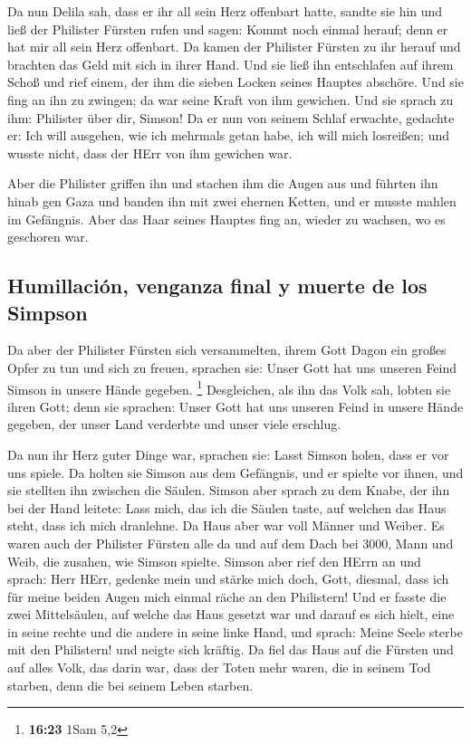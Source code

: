  Da nun Delila sah, dass er ihr all sein Herz offenbart
hatte, sandte sie hin und ließ der Philister Fürsten rufen und sagen:
Kommt noch einmal herauf; denn er hat mir all sein Herz offenbart. Da
kamen der Philister Fürsten zu ihr herauf und brachten das Geld mit sich
in ihrer Hand.  Und sie ließ ihn entschlafen auf ihrem
Schoß und rief einem, der ihm die sieben Locken seines Hauptes abschöre.
Und sie fing an ihn zu zwingen; da war seine Kraft von ihm gewichen.
 Und sie sprach zu ihm: Philister über dir, Simson! Da er
nun von seinem Schlaf erwachte, gedachte er: Ich will ausgehen, wie ich
mehrmals getan habe, ich will mich losreißen; und wusste nicht, dass der
HErr von ihm gewichen war.

 Aber die Philister griffen ihn und stachen ihm die Augen
aus und führten ihn hinab gen Gaza und banden ihn mit zwei ehernen
Ketten, und er musste mahlen im Gefängnis.  Aber das Haar
seines Hauptes fing an, wieder zu wachsen, wo es geschoren war.

\hypertarget{humillaciuxf3n-venganza-final-y-muerte-de-los-simpson}{%
\subsection{Humillación, venganza final y muerte de los
Simpson}\label{humillaciuxf3n-venganza-final-y-muerte-de-los-simpson}}

 Da aber der Philister Fürsten sich versammelten, ihrem
Gott Dagon ein großes Opfer zu tun und sich zu freuen, sprachen sie:
Unser Gott hat uns unseren Feind Simson in unsere Hände gegeben.
\footnote{\textbf{16:23} 1Sam 5,2}  Desgleichen, als ihn
das Volk sah, lobten sie ihren Gott; denn sie sprachen: Unser Gott hat
uns unseren Feind in unsere Hände gegeben, der unser Land verderbte und
unser viele erschlug.

 Da nun ihr Herz guter Dinge war, sprachen sie: Lasst
Simson holen, dass er vor uns spiele. Da holten sie Simson aus dem
Gefängnis, und er spielte vor ihnen, und sie stellten ihn zwischen die
Säulen.  Simson aber sprach zu dem Knabe, der ihn bei der
Hand leitete: Lass mich, das ich die Säulen taste, auf welchen das Haus
steht, dass ich mich dranlehne.  Da Haus aber war voll
Männer und Weiber. Es waren auch der Philister Fürsten alle da und auf
dem Dach bei 3000, Mann und Weib, die zusahen, wie Simson spielte.
 Simson aber rief den HErrn an und sprach: Herr HErr,
gedenke mein und stärke mich doch, Gott, diesmal, dass ich für meine
beiden Augen mich einmal räche an den Philistern!  Und er
fasste die zwei Mittelsäulen, auf welche das Haus gesetzt war und darauf
es sich hielt, eine in seine rechte und die andere in seine linke Hand,
 und sprach: Meine Seele sterbe mit den Philistern! und
neigte sich kräftig. Da fiel das Haus auf die Fürsten und auf alles
Volk, das darin war, dass der Toten mehr waren, die in seinem Tod
starben, denn die bei seinem Leben starben.

